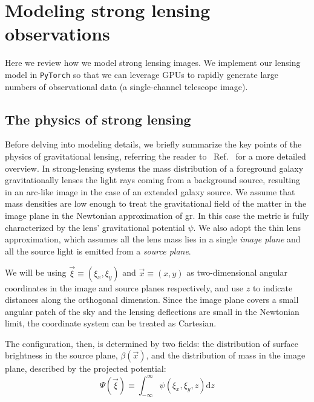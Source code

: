 \section{Modeling strong lensing observations}  \label{sec:sl-model}

Here we review how we model strong lensing images. We implement our lensing model in \texttt{PyTorch} \cite{pytorch} so that we can leverage GPUs to rapidly generate large numbers of observational data (a single-channel telescope image).

\subsection{The physics of strong lensing}
Before delving into modeling details, we briefly summarize the key points of the physics of gravitational lensing, referring the reader to \eg~Ref.~\cite{Meneghetti:2016aa} for a more detailed overview. In strong-lensing systems the mass distribution of a foreground galaxy gravitationally lenses the light rays coming from a background source, resulting in an arc-like image in the case of an extended galaxy source. We assume that mass densities are low enough to treat the gravitational field of the matter in the image plane in the Newtonian approximation of \gls*{gr}. In this case the metric is fully characterized by the lens' gravitational potential $\psi$. We also adopt the thin lens approximation, which assumes all the lens mass lies in a single \emph{image plane} and all the source light is emitted from a \emph{source plane}. 

We will be using $\vec{\xi}\equiv(\xi_x, \xi_y)$ and $\vec{x}\equiv(x, y)$ as two-dimensional angular coordinates in the image and source planes respectively, and use $z$ to indicate distances along the orthogonal dimension. Since the image plane covers a small angular patch of the sky and the lensing deflections are small in the Newtonian limit, the coordinate system can be treated as Cartesian.

The configuration, then, is determined by two fields: the distribution of surface brightness in the source plane, $\beta(\vec{x})$, and the distribution of mass in the image plane, described by the projected potential:
\begin{equation}
	\Psi(\vec{\xi})\equiv \int_{-\infty}^{\infty} \psi(\xi_x, \xi_y, z) \mathrm{d}z
\end{equation}


